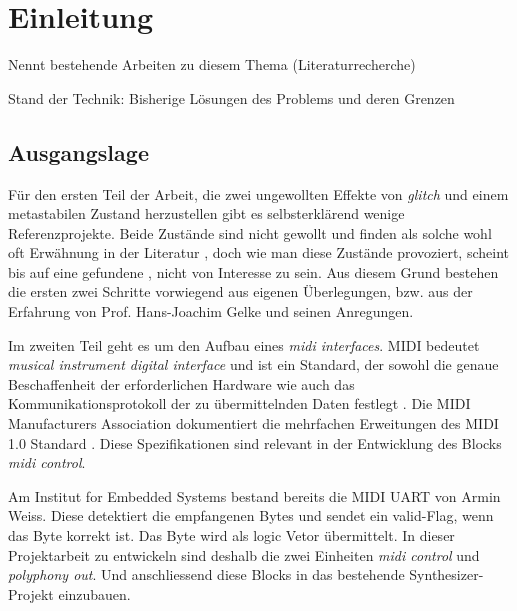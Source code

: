 
\chapter{Einleitung}\label{chap.einleitung}
Nennt bestehende Arbeiten zu diesem Thema (Literaturrecherche)

Stand der Technik: Bisherige Lösungen des Problems und deren Grenzen


\section{Ausgangslage}\label{sect.einleitung_ausgangslage}
Für den ersten Teil der Arbeit, die zwei ungewollten Effekte von \textit{glitch} und einem metastabilen Zustand herzustellen gibt es selbsterklärend wenige Referenzprojekte. Beide Zustände sind nicht gewollt und finden als solche wohl oft Erwähnung in der Literatur \cite{ReferenceManual} \cite{F_glitches} \cite{F_metastability}, doch wie man diese Zustände provoziert, scheint bis auf eine gefundene \cite{Metastabil}, nicht von Interesse zu sein.
Aus diesem Grund bestehen die ersten zwei Schritte vorwiegend aus eigenen Überlegungen, bzw. aus der Erfahrung von Prof. Hans-Joachim Gelke und seinen Anregungen.


Im zweiten Teil geht es um den Aufbau eines \textit{midi interfaces}. MIDI bedeutet \textit{musical instrument digital interface} und ist ein Standard, der sowohl die genaue Beschaffenheit der erforderlichen Hardware wie auch das Kommunikationsprotokoll der zu übermittelnden Daten festlegt \cite{Midi_Braut}. Die MIDI Manufacturers Association dokumentiert die mehrfachen Erweitungen des MIDI 1.0 Standard \cite{Midi_specification}. Diese Spezifikationen sind relevant in der Entwicklung des Blocks \textit{midi control}.

Am Institut for Embedded Systems bestand bereits die MIDI UART von Armin Weiss. Diese detektiert die empfangenen Bytes und sendet ein valid-Flag, wenn das Byte korrekt ist. Das Byte wird als logic Vetor übermittelt. In dieser Projektarbeit zu entwickeln sind deshalb die zwei Einheiten \textit{midi control}  und \textit{polyphony out}. Und anschliessend diese Blocks in das bestehende Synthesizer-Projekt einzubauen.


